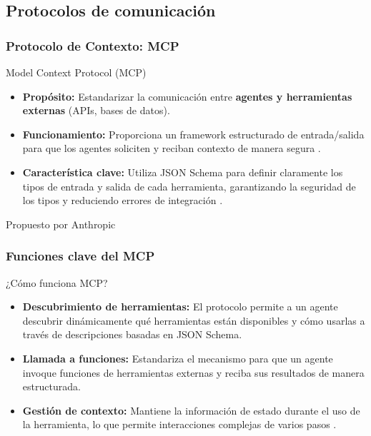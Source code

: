 \documentclass[handout]{beamer}
\begin{document}
\subsection{Protocolos de comunicación}
\begin{frame}
    \frametitle{Protocolo de Contexto: MCP}
  \begin{exampleblock}{Model Context Protocol (MCP)}
    \begin{itemize}
        \item \textbf{Propósito:} Estandarizar la comunicación entre \textbf{agentes y herramientas externas} (APIs, bases de datos).
        \item \textbf{Funcionamiento:} Proporciona un framework estructurado de entrada/salida para que los agentes soliciten y reciban contexto de manera segura \parencite{jeong2025studymcpxa2a}.
        \item \textbf{Característica clave:} Utiliza JSON Schema para definir claramente los tipos de entrada y salida de cada herramienta, garantizando la seguridad de los tipos y reduciendo errores de integración \parencite[citado en][]{jeong2025studymcpxa2a}.
    \end{itemize}
    \raggedleft\footnotesize{Propuesto por Anthropic \parencite{anthropic2024mcp}}
  \end{exampleblock}
\end{frame}

\begin{frame}
    \frametitle{Funciones clave del MCP}
    \begin{block}{¿Cómo funciona MCP?}
        \begin{itemize}
            \item \textbf{Descubrimiento de herramientas:} El protocolo permite a un agente descubrir dinámicamente qué herramientas están disponibles y cómo usarlas a través de descripciones basadas en JSON Schema.
            \item \textbf{Llamada a funciones:} Estandariza el mecanismo para que un agente invoque funciones de herramientas externas y reciba sus resultados de manera estructurada.
            \item \textbf{Gestión de contexto:} Mantiene la información de estado durante el uso de la herramienta, lo que permite interacciones complejas de varios pasos \parencite{jeong2025studymcpxa2a}.
        \end{itemize}
    \end{block}
\end{frame}
\end{document}
